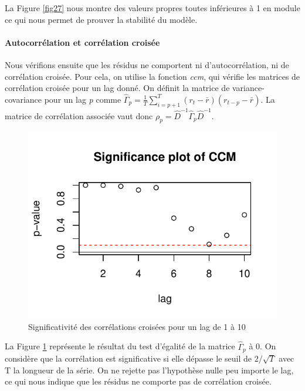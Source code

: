 \documentclass[11pt,]{article}
\let\oldparagraph\paragraph
\renewcommand{\paragraph}[1]{\oldparagraph{#1}\mbox{}}
\begin{document}
La Figure \ref{fig27} nous montre des valeurs propres toutes inférieures
à 1 en module ce qui nous permet de prouver la stabilité du modèle.

\paragraph{Autocorrélation et corrélation
croisée}\label{autocorrelation-et-correlation-croisee}

Nous vérifions ensuite que les résidus ne comportent ni
d'autocorrélation, ni de corrélation croisée. Pour cela, on utilise la
fonction \emph{ccm}, qui vérifie les matrices de corrélation croisée
pour un lag donné. On définit la matrice de variance-covariance pour un
lag \emph{p} comme
\(\hat{\Gamma}_p = \frac{1}{T}\sum_{i=p+1}^{T} (r_t - \bar{r})(r_{t-p} - \bar{r})\).
La matrice de corrélation associée vaut donc
\(\rho_p = \hat{D}^{-1}\hat{\Gamma}_p\hat{D}^{-1}\).

\begin{figure}[htbp]
\centering
\includegraphics{Rapport_final_files/figure-latex/unnamed-chunk-47-1.pdf}
\caption{\label{fig28} Significativité des corrélations croisées pour un
lag de 1 à 10}
\end{figure}

La Figure \ref{fig28} représente le résultat du test d'égalité de la
matrice \(\hat{\Gamma}_p\) à 0. On considère que la corrélation est
significative si elle dépasse le seuil de \(2/\sqrt{T}\) avec T la
longueur de la série. On ne rejette pas l'hypothèse nulle peu importe le
lag, ce qui nous indique que les résidus ne comporte pas de corrélation
croisée.
\end{document}
